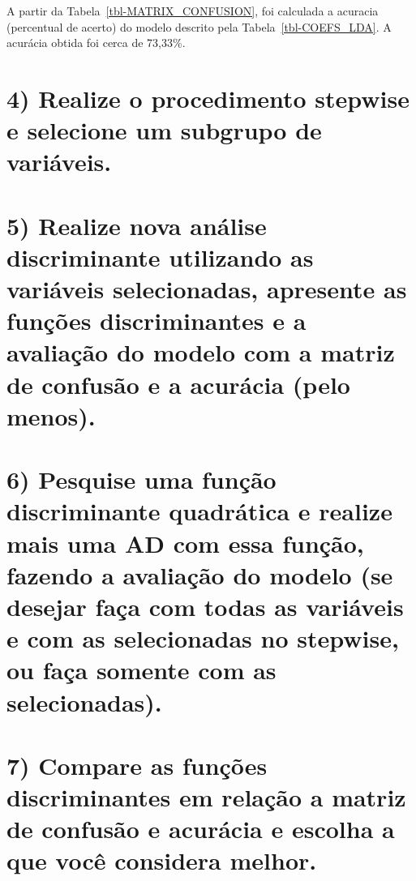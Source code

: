 \documentclass[
  portuguese,
  11pt,
]{article}
\begin{document}
\endgroup

A partir da Tabela~\ref{tbl-MATRIX_CONFUSION}, foi calculada a acuracia
(percentual de acerto) do modelo descrito pela
Tabela~\ref{tbl-COEFS_LDA}. A acurácia obtida foi cerca de 73,33\%.

\section*{4) Realize o procedimento stepwise e selecione um subgrupo de
variáveis.}\label{realize-o-procedimento-stepwise-e-selecione-um-subgrupo-de-variuxe1veis.}

\section*{5) Realize nova análise discriminante utilizando as variáveis
selecionadas, apresente as funções discriminantes e a avaliação do
modelo com a matriz de confusão e a acurácia (pelo
menos).}\label{realize-nova-anuxe1lise-discriminante-utilizando-as-variuxe1veis-selecionadas-apresente-as-funuxe7uxf5es-discriminantes-e-a-avaliauxe7uxe3o-do-modelo-com-a-matriz-de-confusuxe3o-e-a-acuruxe1cia-pelo-menos.}

\section*{6) Pesquise uma função discriminante quadrática e realize mais
uma AD com essa função, fazendo a avaliação do modelo (se desejar faça
com todas as variáveis e com as selecionadas no stepwise, ou faça
somente com as
selecionadas).}\label{pesquise-uma-funuxe7uxe3o-discriminante-quadruxe1tica-e-realize-mais-uma-ad-com-essa-funuxe7uxe3o-fazendo-a-avaliauxe7uxe3o-do-modelo-se-desejar-fauxe7a-com-todas-as-variuxe1veis-e-com-as-selecionadas-no-stepwise-ou-fauxe7a-somente-com-as-selecionadas.}

\section*{7) Compare as funções discriminantes em relação a matriz de
confusão e acurácia e escolha a que você considera
melhor.}\label{compare-as-funuxe7uxf5es-discriminantes-em-relauxe7uxe3o-a-matriz-de-confusuxe3o-e-acuruxe1cia-e-escolha-a-que-vocuxea-considera-melhor.}
\end{document}
